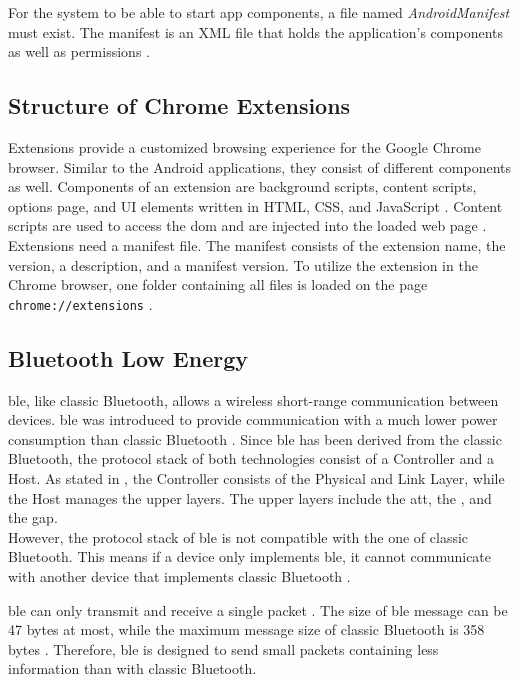 For the system to be able to start app components, a file named \textit{AndroidManifest} must exist. The manifest is an XML file that holds the application's components as well as permissions \cite{AndroidFundamentals}.

\subsection*{Structure of Chrome Extensions}
Extensions provide a customized browsing experience for the Google Chrome browser. Similar to the Android applications, they consist of different components as well. Components of an extension are background scripts, content scripts, options page, and UI elements written in HTML, CSS, and JavaScript \cite{Extensions}. Content scripts are used to access the \gls{dom} and are injected into the loaded web page \cite{DBLP:conf/ndss/LiuZYC12}. \\
Extensions need a manifest file. The manifest consists of the extension name, the version, a description, and a manifest version. To utilize the extension in the Chrome browser, one folder containing all files is loaded on the page \texttt{chrome://extensions} \cite{Extensions}.


\subsection*{Bluetooth Low Energy}
\gls{ble}, like classic Bluetooth, allows a wireless short-range communication between devices. \gls{ble} was introduced to provide communication with a much lower power consumption than classic Bluetooth \cite{DBLP:journals/sensors/GomezOP12}. Since \gls{ble} has been derived from the classic Bluetooth, the protocol stack of both technologies consist of a Controller and a Host. As stated in \cite{DBLP:journals/sensors/GomezOP12}, the Controller consists of the Physical and Link Layer, while the Host manages the upper layers. The upper layers include the \gls{att}, the , and the \gls{gap}. \\
However, the protocol stack of \gls{ble} is not compatible with the one of classic Bluetooth. This means if a device only implements \gls{ble}, it cannot communicate with another device that implements classic Bluetooth \cite{DBLP:journals/sensors/GomezOP12}.

\gls{ble} can only transmit and receive a single packet \cite{DBLP:conf/woot/Ryan13}. The size of \gls{ble} message can be 47 bytes at most, while the maximum message size of classic Bluetooth is 358 bytes \cite{DBLP:journals/sensors/GomezOP12}. Therefore, \gls{ble} is designed to send small packets containing less information than with classic Bluetooth.

